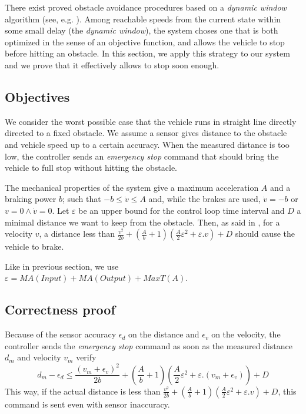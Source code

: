 There exist proved obstacle avoidance procedures based on a \emph{dynamic window} algorithm (see, e.g. \cite{Mitsch-RSS-13}).
Among reachable speeds from the current state within some small delay (the \emph{dynamic window}), the system choses one that is both optimized in the sense of an objective function, and allows the vehicle to stop before hitting an obstacle.
In this section, we apply this strategy to our system and we prove that it effectively allows to stop soon enough.

\subsection{Objectives}

We consider the worst possible case that the vehicle runs in straight line directly directed to a fixed obstacle. We assume a sensor gives distance to the obstacle and vehicle speed up to a certain accuracy.
When the measured distance is too low, the controller sends an \emph{emergency stop} command that should bring the vehicle to full stop without hitting the obstacle.

The mechanical properties of the system give a maximum acceleration $A$ and a braking power $b$; such that $-b \leq \dot v \leq A$ and, while the brakes are used, $\dot v = -b$ or $v = 0 \wedge \dot v = 0$.
Let $\varepsilon$ be an upper bound for the control loop time interval and $D$ a minimal distance we want to keep from the obstacle.
Then, as said in \cite{Mitsch-RSS-13}, for a velocity $v$, a distance less than $\frac {v^2} {2b} + \left(\frac A b + 1 \right) \left( \frac A 2 \varepsilon^2 + \varepsilon.v\right) + D$ should cause the vehicle to brake.

Like in previous section, we use $\varepsilon = MA(Input) + MA(Output) + MaxT(A)$.

\subsection{Correctness proof}

Because of the sensor accuracy $\epsilon_d$ on the distance and $\epsilon_v$ on the velocity, the controller sends the \emph{emergency stop} command as soon as the measured distance $d_m$ and velocity $v_m$ verify
\[ d_m - \epsilon_d \leq \frac {(v_m + \epsilon_v)^2} {2b} + \left(\frac A b + 1 \right) \left( \frac A 2 \varepsilon^2 + \varepsilon.(v_m + \epsilon_v)\right) + D\]
This way, if the actual distance is less than $\frac {v^2} {2b} + \left(\frac A b + 1 \right) \left( \frac A 2 \varepsilon^2 + \varepsilon.v\right) + D$, this command is sent even with sensor inaccuracy.

